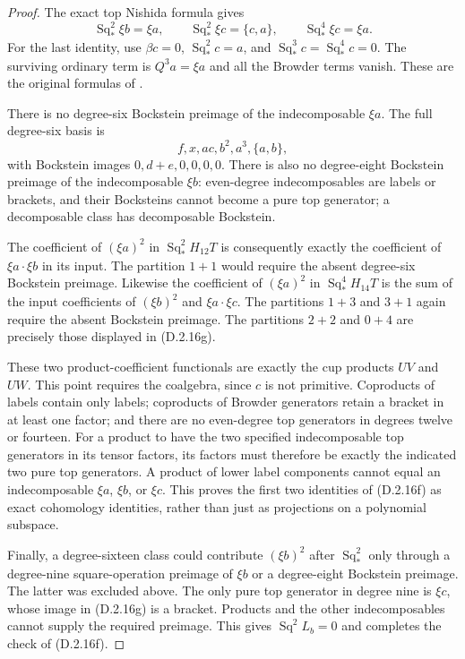 \begin{proof}
The exact top Nishida formula gives
\[
 \operatorname{Sq}_*^2\xi b=\xi a,\qquad
 \operatorname{Sq}_*^2\xi c=\{c,a\},\qquad
 \operatorname{Sq}_*^4\xi c=\xi a.
 \tag{D.2.16g}
\]
For the last identity, use
$\beta c=0$, $\operatorname{Sq}_*^2c=a$, and
$\operatorname{Sq}_*^3c=\operatorname{Sq}_*^4c=0$.
The surviving ordinary term is $Q^3a=\xi a$ and all the
Browder terms vanish. These are the original formulas of
\cite[Chapter III, Theorems~1.2--1.4, pp.~216--219,
especially pp.~217--218]{I_CohenLadaMay1976}.

There is no degree-six Bockstein preimage of the indecomposable
$\xi a$. The full degree-six basis is
\[
 f,x,ac,b^2,a^3,\{a,b\},
\]
with Bockstein images $0,d+e,0,0,0,0$. There is also no
degree-eight Bockstein preimage of the indecomposable $\xi b$:
even-degree indecomposables are labels or brackets, and their
Bocksteins cannot become a pure top generator; a decomposable
class has decomposable Bockstein.

The coefficient of $(\xi a)^2$ in
$\operatorname{Sq}_*^2H_{12}T$ is consequently exactly the
coefficient of $\xi a\cdot\xi b$ in its input. The partition
$1+1$ would require the absent degree-six Bockstein preimage.
Likewise the coefficient of $(\xi a)^2$ in
$\operatorname{Sq}_*^4H_{14}T$ is the sum of the input
coefficients of $(\xi b)^2$ and $\xi a\cdot\xi c$.
The partitions $1+3$ and $3+1$ again require the absent
Bockstein preimage. The partitions $2+2$ and $0+4$ are
precisely those displayed in \textup{(D.2.16g)}.

These two product-coefficient functionals are exactly the cup
products $UV$ and $UW$. This point requires the coalgebra, since
$c$ is not primitive. Coproducts of labels contain only labels;
coproducts of Browder generators retain a bracket in at least
one factor; and there are no even-degree top generators in
degrees twelve or fourteen. For a product to have the two
specified indecomposable top generators in its tensor factors,
its factors must therefore be exactly the indicated two pure
top generators. A product of lower label components cannot
equal an indecomposable $\xi a$, $\xi b$, or $\xi c$.
This proves the first two identities of \textup{(D.2.16f)}
as exact cohomology identities, rather than just as projections
on a polynomial subspace.

Finally, a degree-sixteen class could contribute $(\xi b)^2$
after $\operatorname{Sq}_*^2$ only through a degree-nine
square-operation preimage of $\xi b$ or a degree-eight
Bockstein preimage. The latter was excluded above. The only
pure top generator in degree nine is $\xi c$, whose image in
\textup{(D.2.16g)} is a bracket. Products and the other
indecomposables cannot supply the required preimage. This gives
$\operatorname{Sq}^2L_b=0$ and completes the check of
\textup{(D.2.16f)}.


\end{proof}
